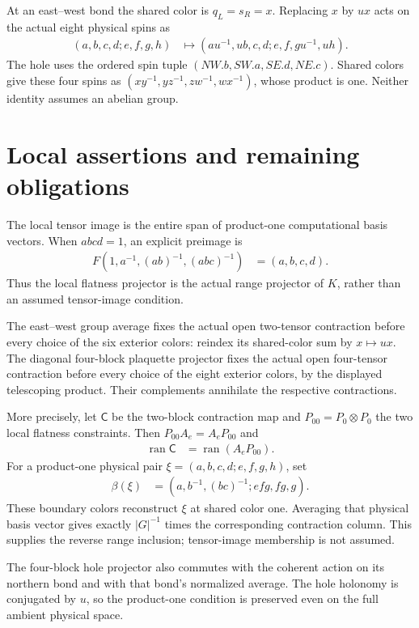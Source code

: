 \documentclass{article}
\begin{document}
At an east--west bond the shared color is $q_L=s_R=x$. Replacing
$x$ by $ux$ acts on the actual eight physical spins as
\begin{align}
    (a,b,c,d;e,f,g,h) & \longmapsto
    (au^{-1},ub,c,d;e,f,gu^{-1},uh).
\end{align}
The hole uses the ordered spin tuple
$(NW.b,SW.a,SE.d,NE.c)$. Shared colors give these four spins as
$(xy^{-1},yz^{-1},zw^{-1},wx^{-1})$, whose product is one.
Neither identity assumes an abelian group.

\section{Local assertions and remaining obligations}
The local tensor image is the entire span of product-one computational
basis vectors. When $abcd=1$, an explicit preimage is
\begin{align}
    F(1,a^{-1},(ab)^{-1},(abc)^{-1}) & =(a,b,c,d).
\end{align}
Thus the local flatness projector is
the actual range projector of $K$, rather than an assumed tensor-image
condition.

The east--west group average fixes the actual open two-tensor contraction
before every choice of the six exterior colors: reindex its shared-color
sum by $x\mapsto ux$. The diagonal four-block plaquette projector fixes
the actual open four-tensor contraction before every choice of the eight
exterior colors, by the displayed telescoping product. Their complements
annihilate the respective contractions.

More precisely, let $\mathsf C$ be the two-block contraction map and
$P_{00}=P_0\otimes P_0$ the two local flatness constraints. Then
$P_{00}A_e=A_eP_{00}$ and
\begin{align}
    \operatorname{ran}\mathsf C & =\operatorname{ran}(A_eP_{00}).
\end{align}
For a product-one physical pair $\xi=(a,b,c,d;e,f,g,h)$, set
\begin{align}
    \beta(\xi) & =(a,b^{-1},(bc)^{-1};efg,fg,g).
\end{align}
These boundary colors reconstruct $\xi$ at shared color one.
Averaging that physical basis vector gives exactly $|G|^{-1}$ times
the corresponding contraction column. This supplies the reverse range
inclusion; tensor-image membership is not assumed.

The four-block hole projector also commutes with the coherent action
on its northern bond and with that bond's normalized average.
The hole holonomy is conjugated by $u$, so the product-one condition
is preserved even on the full ambient physical space.
\end{document}
